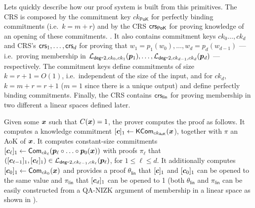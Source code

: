Lets quickly describe how our proof system is built from this primitives. The CRS is composed by the commitment key $ck_\mathsf{PoK}$ for perfectly binding commitments (i.e.~$k=m+r$) and by the CRS $\mathsf{crs}_\mathsf{PoK}$ for proving knowledge of an opening of these commitments.
. It also contains commitment keys $ck_0\ldots,ck_d$ and CRS's $\mathsf{crs}_1,\ldots,\mathsf{crs}_d$ for proving that $w_1=p_1(w_0),\ldots,w_d=p_d(w_{d-1})$ --- i.e.~proving membership in $\mathcal{L}_{\mathsf{deg}\mbox{-}2,ck_{0},ck_1}({\boldsymbol{p}}_1),\allowbreak\ldots,\allowbreak\mathcal{L}_{\mathsf{deg}\mbox{-}2,ck_{d-1},ck_d}({\boldsymbol{p}}_d)$ --- respectively. The commitment keys define commitments of size $k=r+1=O(1)$, i.e.~independent of the size of the input, and for $ck_d$, $k=m+r=r+1$ ($m=1$ since there is a unique output) and define perfectly binding commitments. Finally, the CRS contains $\mathsf{crs}_\mathsf{lin}$ for proving membership in two different a linear spaces defined later.

Given some ${\boldsymbol{x}}$ such that $C({\boldsymbol{x}})= 1$, the prover computes the proof as follows. It computes a knowledge commitment $[{\boldsymbol{c}}]_1\gets\mathsf{KCom}_{ck_\mathsf{AoK}}({\boldsymbol{x}}$), together with $\pi$ an AoK of ${\boldsymbol{x}}$. It computes constant-size commitments $[{\boldsymbol{c}}_\ell]_1\gets\mathsf{Com}_{ck_\ell}({\boldsymbol{p}}_\ell\circ\ldots\circ{\boldsymbol{p}}_0({\boldsymbol{x}}))$  with proofs $\pi_\ell$ that $([{\boldsymbol{c}}_{\ell-1}]_1,[{\boldsymbol{c}}_\ell]_1)\in\mathcal{L}_{\mathsf{deg}\mbox{-}2,ck_{\ell-1},ck_\ell}({\boldsymbol{p}}_\ell)$, for $1\leq \ell\leq d$. It additionally computes $[{\boldsymbol{c}}_{0}]_1\gets\mathsf{Com}_{ck_{0}}({\boldsymbol{x}})$ and provides a proof $\theta_\mathsf{lin}$ that $[{\boldsymbol{c}}]_1$ and $[{\boldsymbol{c}}_{0}]_1$ can be opened to the same value and $\pi_\mathsf{lin}$ that $[{\boldsymbol{c}}_d]_1$  can be opened to 1 (both $\theta_\mathsf{lin}$ and $\pi_\mathsf{lin}$ can be easily constructed from a QA-NIZK argument of membership in a linear space as shown in \cite{AC:GonHevRaf15}).

